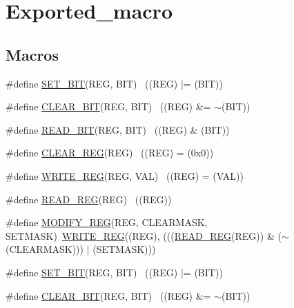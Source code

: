 \hypertarget{group___exported__macro}{}\section{Exported\+\_\+macro}
\label{group___exported__macro}
\subsection*{Macros}
\begin{DoxyCompactItemize}
\item 
\#define \hyperlink{group___exported__macro_gafe96f32216ed830403db91a8b7d800ab}{S\+E\+T\+\_\+\+B\+IT}(R\+EG,  B\+IT)      ~((R\+EG) $\vert$= (B\+IT))
\item 
\#define \hyperlink{group___exported__macro_ga4c7b1529ef62c6310390108b0efc2bf0}{C\+L\+E\+A\+R\+\_\+\+B\+IT}(R\+EG,  B\+IT)  ~((R\+EG) \&= $\sim$(B\+IT))
\item 
\#define \hyperlink{group___exported__macro_ga8e897a88f6313cd46cf96224a47f11bf}{R\+E\+A\+D\+\_\+\+B\+IT}(R\+EG,  B\+IT)    ~((R\+EG) \& (B\+IT))
\item 
\#define \hyperlink{group___exported__macro_gad659fe5750e80990cb29b7b69562536e}{C\+L\+E\+A\+R\+\_\+\+R\+EG}(R\+EG)            ~((R\+EG) = (0x0))
\item 
\#define \hyperlink{group___exported__macro_gaf244d5e7076977aaa554cf2dab8bdbaa}{W\+R\+I\+T\+E\+\_\+\+R\+EG}(R\+EG,  V\+AL)  ~((R\+EG) = (V\+AL))
\item 
\#define \hyperlink{group___exported__macro_gaddb3cc7b2dc9c558f8fdb7b6fae4ec41}{R\+E\+A\+D\+\_\+\+R\+EG}(R\+EG)              ~((R\+EG))
\item 
\#define \hyperlink{group___exported__macro_ga6553c99f510c3bab8cc0a91602053247}{M\+O\+D\+I\+F\+Y\+\_\+\+R\+EG}(R\+EG,  C\+L\+E\+A\+R\+M\+A\+SK,  S\+E\+T\+M\+A\+SK)~\hyperlink{openmotestm_2library_2inc_2stm32f10x__map_8h_af244d5e7076977aaa554cf2dab8bdbaa}{W\+R\+I\+T\+E\+\_\+\+R\+EG}((R\+EG), (((\hyperlink{openmotestm_2library_2inc_2stm32f10x__map_8h_addb3cc7b2dc9c558f8fdb7b6fae4ec41}{R\+E\+A\+D\+\_\+\+R\+EG}(R\+EG)) \& ($\sim$(C\+L\+E\+A\+R\+M\+A\+SK))) $\vert$ (S\+E\+T\+M\+A\+SK)))
\item 
\#define \hyperlink{group___exported__macro_gafe96f32216ed830403db91a8b7d800ab}{S\+E\+T\+\_\+\+B\+IT}(R\+EG,  B\+IT)      ~((R\+EG) $\vert$= (B\+IT))
\item 
\#define \hyperlink{group___exported__macro_ga4c7b1529ef62c6310390108b0efc2bf0}{C\+L\+E\+A\+R\+\_\+\+B\+IT}(R\+EG,  B\+IT)  ~((R\+EG) \&= $\sim$(B\+IT))

\end{DoxyCompactItemize}

